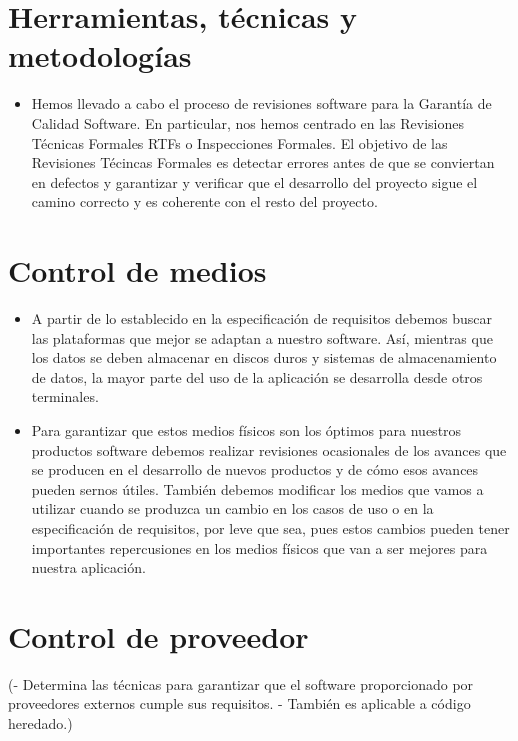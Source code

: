 \documentclass[spanish,a4paper,11pt, twoside]{report}	%
\begin{document}
\newpage
\mbox{}
\thispagestyle{empty}						%
\newpage

\chapter{ Herramientas, técnicas y metodologías}
	\begin{itemize}
	\item Hemos llevado a cabo el proceso de revisiones software para la Garantía de Calidad Software. En particular, nos hemos centrado en las Revisiones Técnicas Formales RTFs o Inspecciones Formales. El objetivo de las Revisiones Técincas Formales es detectar errores antes de que se conviertan en defectos y garantizar y verificar que el desarrollo del proyecto sigue el camino correcto y es coherente con el resto del proyecto.
	\end{itemize}

\newpage
\mbox{}
\thispagestyle{empty}						%
\newpage

\chapter{ Control de medios}
	\begin{itemize}
		\item A partir de lo establecido en la especificación de requisitos debemos buscar las plataformas que mejor se adaptan a nuestro software. Así, mientras que los datos se deben almacenar en discos duros y sistemas de almacenamiento de datos, la mayor parte del uso de la aplicación se desarrolla desde otros terminales.
		\item Para garantizar que estos medios físicos son los óptimos para nuestros productos software debemos realizar revisiones ocasionales de los avances que se producen en el desarrollo de nuevos productos y de cómo esos avances pueden sernos útiles. También debemos modificar los medios que vamos a utilizar cuando se produzca un cambio en los casos de uso o en la especificación de requisitos, por leve que sea, pues estos cambios pueden tener importantes repercusiones en los medios físicos que van a ser mejores para nuestra aplicación.
	\end{itemize}

\newpage
\mbox{}
\thispagestyle{empty}						%
\newpage

\chapter{ Control de proveedor}
	(- Determina las técnicas para garantizar que el
	software proporcionado por proveedores externos
	cumple sus requisitos.
	- También es aplicable a código heredado.)
\end{document}
